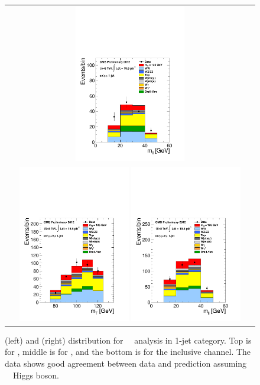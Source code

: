 \begin{figure}[htp]
\begin{tabular}{c}
\includegraphics[width=0.45\textwidth]{figures/hww_analysis17_125_ALL_sf_1j_mll.pdf}
\\
\includegraphics[width=0.45\textwidth]{figures/hww_analysis17_125_ALL_incl_1j_mt.pdf}
\includegraphics[width=0.45\textwidth]{figures/hww_analysis17_125_ALL_incl_1j_mll.pdf}
\end{tabular} 
\caption{ \mT(left) and \mll(right) distribution for ~\GeV\ analysis 
in 1-jet category. 
Top is for \DF, middle is for \SF, and the bottom is for the inclusive channel.  
The data shows good agreement between data and prediction assuming ~\GeV\ Higgs boson.} 
\label{fig:cutbased125_1jet} 
\end{figure} 

